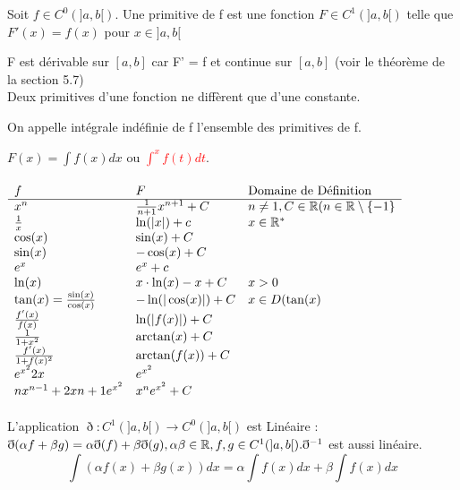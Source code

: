 \documentclass[12pt,a4paper]{article}
\begin{document}
{\begin{boite}
	\Definition Soit $f\in C^0(]a,b[)$. Une primitive de f est une fonction $F \in C^1(]a,b[)$ telle que $F'(x) = f(x)$ pour $x \in ]a,b[$
\end{boite}
\Remarque F est dérivable sur $[a,b]$ car F' = f et continue sur $[a,b]$ (voir le théorème de la section 5.7)\\
\Remarque Deux primitives d'une fonction ne diffèrent que d'une constante.
\begin{boite}
\Definition On appelle intégrale indéfinie de f l'ensemble des primitives de f.
\end{boite}
 $F(x) = \int f(x)dx$ ou \textcolor{red}{$\int^x f(t) dt$}.\\
\\
$\begin{array}{lll}
f & F & \text{Domaine de Définition}\\
\hline
x^n & \frac{1}{n+1}x^{n+1} + C & n\neq 1, C \in \mathbb{R} (n \in \mathbb{R}\setminus\{-1\}\\
\frac{1}{x}& \ln(|x|) + c & x \in \mathbb{R}^* \\
\cos(x) & \sin(x) + C &\\
\sin(x) & -\cos(x) + C &\\
e^x & e^x + c &\\
\ln(x) & x\cdot\ln(x) - x + C & x > 0\\
\tan(x) = \frac{\sin(x)}{\cos(x)} & -\ln(|\cos(x)|) + C & x \in D(\tan(x)\\
\frac{f'(x)}{f(x)} & \ln(|f(x)|) +C\\
\frac{1}{1+x^2} & \arctan(x) + C &\\
\frac{f'(x)}{1+f(x)^2} & \arctan(f(x)) + C &\\
e^{x^2} 2x & e^{x^2} &\\
nx^{n-1}+2x{n+1}e^{x^2} & x^ne^{x^2} + C
\end{array}$\\
\Remarque\\
L'application  $\eth : C^1 (]a,b[) \to C^0 (]a,b[)$ est Linéaire : $\eth(\alpha f + \beta g) = \alpha\eth(f) +  \beta\eth(g), \alpha \beta \in \mathbb{R}, f,g \in C^1 (]a,b[). \eth^{-1}$ est aussi linéaire.
\begin{equation}
 \int(\alpha f(x) + \beta g(x))dx = \alpha \int f(x)dx + \beta\int f(x) dx	
\end{equation}
}
\end{document}
